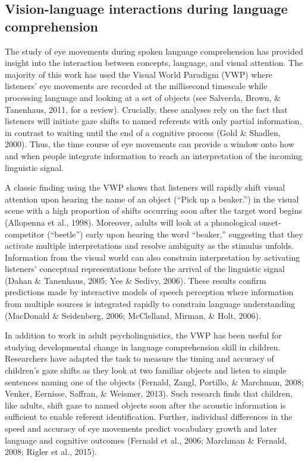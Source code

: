 \documentclass[,man,floatsintext]{apa6}
\begin{document}
\hypertarget{vision-language-interactions-during-language-comprehension}{%
\subsection{Vision-language interactions during language comprehension}\label{vision-language-interactions-during-language-comprehension}}

The study of eye movements during spoken language comprehension has provided insight into the interaction between concepts, language, and visual attention. The majority of this work has used the Visual World Paradigm (VWP) where listeners' eye movements are recorded at the millisecond timescale while processing language and looking at a set of objects (see Salverda, Brown, \& Tanenhaus, 2011, for a review). Crucially, these analyses rely on the fact that listeners will initiate gaze shifts to named referents with only partial information, in contrast to waiting until the end of a cognitive process (Gold \& Shadlen, 2000). Thus, the time course of eye movements can provide a window onto how and when people integrate information to reach an interpretation of the incoming linguistic signal.

A classic finding using the VWP shows that listeners will rapidly shift visual attention upon hearing the name of an object (\enquote{Pick up a beaker.}) in the visual scene with a high proportion of shifts occurring soon after the target word begins (Allopenna et al., 1998). Moreover, adults will look at a phonological onset-competitor (\enquote{beetle}) early upon hearing the word \enquote{beaker,} suggesting that they activate multiple interpretations and resolve ambiguity as the stimulus unfolds. Information from the visual world can also constrain interpretation by activating listeners' conceptual representations before the arrival of the linguistic signal (Dahan \& Tanenhaus, 2005; Yee \& Sedivy, 2006). These results confirm predictions made by interactive models of speech perception where information from multiple sources is integrated rapidly to constrain language understanding (MacDonald \& Seidenberg, 2006; McClelland, Mirman, \& Holt, 2006).

In addition to work in adult psycholinguistics, the VWP has been useful for studying developmental change in language comprehension skill in children. Researchers have adapted the task to measure the timing and accuracy of children's gaze shifts as they look at two familiar objects and listen to simple sentences naming one of the objects (Fernald, Zangl, Portillo, \& Marchman, 2008; Venker, Eernisse, Saffran, \& Weismer, 2013). Such research finds that children, like adults, shift gaze to named objects soon after the acoustic information is sufficient to enable referent identification. Further, individual differences in the speed and accuracy of eye movements predict vocabulary growth and later language and cognitive outcomes (Fernald et al., 2006; Marchman \& Fernald, 2008; Rigler et al., 2015).
\end{document}
